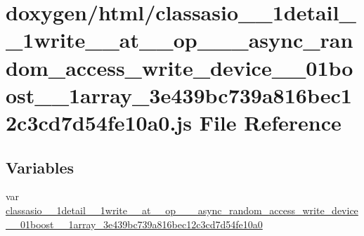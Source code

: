 \hypertarget{classasio__1__1detail__1__1write____at____op__3__01__async__random__access__write__device__00__0621f37c6c6200352c080fe69824512b7}{}\section{doxygen/html/classasio\+\_\+\_\+1detail\+\_\+\_\+1write\+\_\+\+\_\+at\+\_\+\+\_\+op\+\_\+\_\+\_\+async\+\_\+random\+\_\+access\+\_\+write\+\_\+device\+\_\+\_\+01boost\+\_\+\_\+1array\+\_\+3e439bc739a816bec12c3cd7d54fe10a0.js File Reference}
\label{classasio__1__1detail__1__1write____at____op__3__01__async__random__access__write__device__00__0621f37c6c6200352c080fe69824512b7}
\subsection*{Variables}
\begin{DoxyCompactItemize}
\item 
var \hyperlink{classasio__1__1detail__1__1write____at____op__3__01__async__random__access__write__device__00__0621f37c6c6200352c080fe69824512b7_ac597a895487909c21ecab615065aa2ad}{classasio\+\_\+\_\+1detail\+\_\+\_\+1write\+\_\+\+\_\+at\+\_\+\+\_\+op\+\_\+\_\+\_\+async\+\_\+random\+\_\+access\+\_\+write\+\_\+device\+\_\+\_\+01boost\+\_\+\_\+1array\+\_\+3e439bc739a816bec12c3cd7d54fe10a0}
\end{DoxyCompactItemize}


